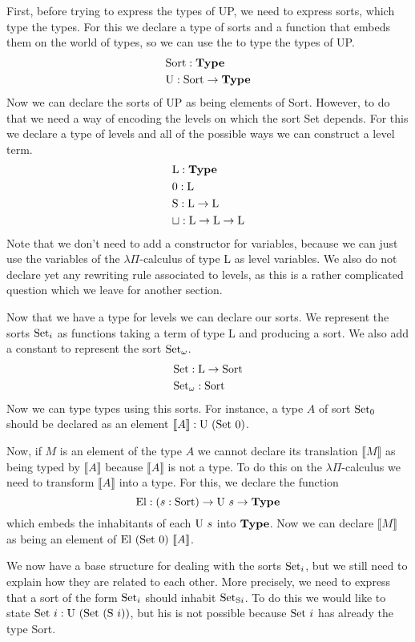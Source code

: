 \documentclass[]{StandardTemplate}
\begin{document}
First, before trying to express the types of UP, we need to express sorts, which type the types. For this we declare a type of sorts and a function that embeds them on the world of types, so we can use the to type the types of UP.
\begin{align*}
&\text{Sort} : \textbf{Type} \\
&\text{U} : \text{Sort} \to \textbf{Type}
\end{align*}
Now we can declare the sorts of UP as being elements of Sort. However, to do that we need a way of encoding the levels on which the sort Set depends. For this we declare a type of levels and all of the possible ways we can construct a level term.
\begin{align*}
  &\text{L} : \textbf{Type} \\
  &0 : \text{L} \\
  &\text{S} : \text{L} \to \text{L} \\
  &\sqcup : \text{L} \to \text{L} \to \text{L}
\end{align*}
Note that we don't need to add a constructor for variables, because we can just use the variables of the $ \lambda \Pi $-calculus of type L as level variables. We also do not declare yet any rewriting rule associated to levels, as this is a rather complicated question which we leave for another section.

Now that we have a type for levels we can declare our sorts. We represent the sorts $ \text{Set}_i $ as functions taking a term of type L and producing a sort. We also add a constant to represent the sort $ \text{Set}_\omega $.
\begin{align*}
  &\text{Set} : \text{L} \to \text{Sort} \\
  &\text{Set}_\omega : \text{Sort}
\end{align*}
Now we can type types using this sorts. For instance, a type $ A $ of sort $ \text{Set}_0 $ should be declared as an element $\llbracket A \rrbracket : \text{U}~(\text{Set}~0) $.

Now, if $ M$ is an element of the type $ A $ we cannot declare its translation $ \llbracket M \rrbracket $ as being typed by $ \llbracket A \rrbracket $ because $ \llbracket A \rrbracket $ is not a type. To do this on the $ \lambda \Pi $-calculus we need to transform $ \llbracket A \rrbracket $ into a type. For this, we declare the function \[
\text{El} : (s : \text{Sort}) \to \text{U}~s \to \textbf{Type}
\]which embeds the inhabitants of each $ \text{U}~s $ into $ \textbf{Type} $. Now we can declare $ \llbracket M \rrbracket $ as being an element of $ \text{El}~(\text{Set}~0)~\llbracket A \rrbracket $.

We now have a base structure for dealing with the sorts $ \text{Set}_i $, but we still need to explain how they are related to each other. More precisely, we need to express that a sort of the form $ \text{Set}_i $ should inhabit $ \text{Set}_{\text{S} i} $. To do this we would like to state $ \text{Set}~i : \text{U}~(\text{Set}~(\text{S}~i)) $, but his is not possible because $ \text{Set}~i $ has already the type Sort.
\end{document}
